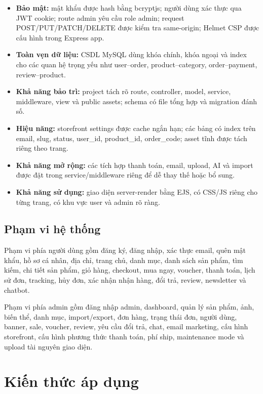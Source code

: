 \documentclass[12pt,a4paper]{report}
\begin{document}
\begin{itemize}
    \item \textbf{Bảo mật:} mật khẩu được hash bằng bcryptjs; người dùng xác thực qua JWT cookie; route admin yêu cầu role admin; request POST/PUT/PATCH/DELETE được kiểm tra same-origin; Helmet CSP được cấu hình trong Express app.
    \item \textbf{Toàn vẹn dữ liệu:} CSDL MySQL dùng khóa chính, khóa ngoại và index cho các quan hệ trọng yếu như user--order, product--category, order--payment, review--product.
    \item \textbf{Khả năng bảo trì:} project tách rõ route, controller, model, service, middleware, view và public assets; schema có file tổng hợp và migration đánh số.
    \item \textbf{Hiệu năng:} storefront settings được cache ngắn hạn; các bảng có index trên email, slug, status, user\_id, product\_id, order\_code; asset tĩnh được tách riêng theo trang.
    \item \textbf{Khả năng mở rộng:} các tích hợp thanh toán, email, upload, AI và import được đặt trong service/middleware riêng để dễ thay thế hoặc bổ sung.
    \item \textbf{Khả năng sử dụng:} giao diện server-render bằng EJS, có CSS/JS riêng cho từng trang, có khu vực user và admin rõ ràng.
\end{itemize}

\section{Phạm vi hệ thống}

Phạm vi phía người dùng gồm đăng ký, đăng nhập, xác thực email, quên mật khẩu, hồ sơ cá nhân, địa chỉ, trang chủ, danh mục, danh sách sản phẩm, tìm kiếm, chi tiết sản phẩm, giỏ hàng, checkout, mua ngay, voucher, thanh toán, lịch sử đơn, tracking, hủy đơn, xác nhận nhận hàng, đổi trả, review, newsletter và chatbot.

Phạm vi phía admin gồm đăng nhập admin, dashboard, quản lý sản phẩm, ảnh, biến thể, danh mục, import/export, đơn hàng, trạng thái đơn, người dùng, banner, sale, voucher, review, yêu cầu đổi trả, chat, email marketing, cấu hình storefront, cấu hình phương thức thanh toán, phí ship, maintenance mode và upload tài nguyên giao diện.

\chapter{Kiến thức áp dụng}
\end{document}
